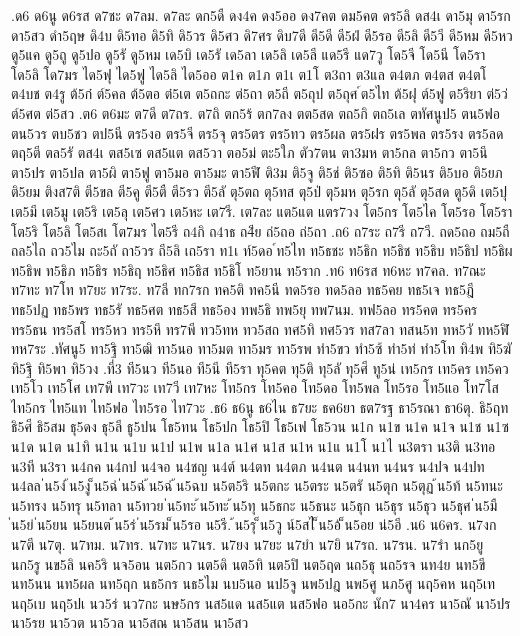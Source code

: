 {{.ด6
ด6นู
ด6รส
ด7ชะ
ด7ลม.
ด7ละ
ดก5ดื
ดง4ค
ดง5ออ
ดง7คต
ดม5คต
ดร5ลิ
ดส4เ
ดา5มุ
ดา5รก
ดา5สว
ดำ5ฤษ
ดิ4บ
ดิ5ทอ
ดิ5ทิ
ดิ5วร
ดิ5ศว
ดิ7ศร
ดิบ7ดี
ดี5ดี
ดี5ฝ่
ดี5รอ
ดี5ลิ
ดี5วี
ดี5หม
ดี5หว
ดู5แค
ดู5ถู
ดู5ปอ
ดู5รั
ดู5หม
เด5บิ
เด5รั
เด5ลา
เด5ลิ
เด5ลี
แด5รี
แด7วู
โด5จี
โด5นี
โด5รา
โด5ลิ
โด7มร
ได5ฟุ
ได5ฟู
ได5ลิ
ได5ออ
ต1ค
ต1ภ
ต1เ
ต1โ
ต3ถา
ต3แล
ต4ตภ
ต4ตส
ต4ตโ
ต4บช
ต4รู
ต้5ก๋
ต์5คล
ต้5ตอ
ต๋5เต
ต5ถกะ
ต่5ถา
ต5ถี
ต5ถุป
ต5ถุศ
์ต5ไท
ต้5ฝุ
ต์5ฟู
ต5ริยา
ต่5ว่
ต์5ศต
ต่5สว
.ต6
ต6มะ
ต7ดี
ต7ถร.
ต7ถิ
ตก5ร้
ตก7ลง
ตต5สด
ตถ5กิ
ตถ5เล
ตทัศนูป5
ตน5ฟอ
ตน5วร
ตบ5ชว
ตป5นี
ตร5งอ
ตร5จี
ตร5จุ
ตร5ตร
ตร5ทว
ตร5ผล
ตร5ฝร
ตร5พล
ตร5รง
ตร5ลด
ตฤ5ตี
ตล5รั
ตส4เ
ตส5เซ
ตส5แต
ตส5วา
ตอ5ม่
ตะ5ใภ
ตัว7ตน
ตา3มห
ตา5กล
ตา5กว
ตา5นึ
ตา5ปร
ตา5ปล
ตา5ผิ
ตา5ฟู
ตา5มอ
ตา5มะ
ตา5ฬี
ติ3ม
ติ5จู
ติ5ช่
ติ5ซอ
ติ5ทิ
ติ5นร
ติ5บอ
ติ5ยภ
ติ5ยม
ติงส7ติ
ตี5ขล
ตี5คู
ตี5ตื
ตี5รว
ตี5ลั
ตุ5ตถ
ตุ5ทส
ตุ5ป่
ตุ5มห
ตุ5รก
ตุ5ลั
ตุ5สด
ตู5ดิ
เต5ปุ
เต5มี
เต5มู
เต5ริ
เต5ลุ
เต5ศว
เต5หะ
เต7รี.
เต7ละ
แต5แต
แตร7วง
โต5กร
โต5ไค
โต5รอ
โต5รา
โต5ริ
โต5ลิ
โต5สเ
โต7มร
ไต5รี
ถ4กิ
ถ4าธ
ถ4ีย
ถ่5ถอ
ถ่5ถา
.ถ6
ถ7ระ
ถ7รี
ถ7วี.
ถด5ถอ
ถม5ถื
ถล5ไถ
ถว5ไม
ถะ5ถั
ถา5วร
ถี5ลิ
เถ5รา
ท1เ
ท์5ดอ
์ท5ไท
ท5ธชะ
ท5ธิก
ท5ธิช
ท5ธิบ
ท5ธิป
ท5ธิผ
ท5ธิพ
ท5ธิภ
ท5ธิร
ท5ธิฤ
ท5ธิศ
ท5ธิส
ท5ธิโ
ท5ยาน
ท5ราก
.ท6
ท6รส
ท6หะ
ท7คล.
ท7ณะ
ท7ทะ
ท7โท
ท7ยะ
ท7ระ.
ท7ลี
ทก7รก
ทค5ติ
ทค5นี
ทด5รอ
ทด5ลอ
ทธ5คย
ทธ5เจ
ทธ5ฎี
ทธ5ปฏ
ทธ5พร
ทธ5รั
ทธ5ศต
ทธ5สี
ทธ5อง
ทพ5ธิ
ทพ5ยุ
ทพ7นม.
ทฟ5ลอ
ทร5คต
ทร5คร
ทร5ธน
ทร5สโ
ทร5หว
ทร5หึ
ทร7พี
ทว5ทห
ทว5สถ
ทศ5ทิ
ทศ5วร
ทส7ลา
ทสน5ท
ทห5วั
ทห5ฬิ
ทห7ระ
.ทัศนู5
ทา5ฐิ
ทา5ฒิ
ทา5นอ
ทา5มต
ทา5มร
ทา5รพ
ทำ5ขว
ทำ5ซ้
ทำ5ท่
ทำ5โท
ทิ4พ
ทิ5ฆั
ทิ5ฐิ
ทิ5พา
ทิ5วง
.ที่3
ที5นว
ที5นอ
ที5นี
ที5รา
ทุ5คต
ทุ5ติ
ทุ5ลั
ทุ5ศี
ทู5น่
เท5กร
เท5คร
เท5คว
เท5โว
เท5โศ
เท7พี
เท7วะ
เท7วี
เท7หะ
โท5กร
โท5คอ
โท5ดอ
โท5พล
โท5รอ
โท5แอ
โท7โส
ไท5กร
ไท5แท
ไท5ฟอ
ไท5รอ
ไท7วะ
.ธ6
ธ6นู
ธ6ไน
ธ7ยะ
ธค6ยา
ธต7รฐ
ธา5รณา
ธา6ตุ.
ธิ5ฤท
ธิ5ศี
ธิ5สม
ธุ5ดง
ธุ5ลี
ธู5ปน
โธ5ทน
โธ5ปก
โธ5ปิ
โธ5เฟ
โธ5วน
น1ก
น1ข
น1ค
น1จ
น1ช
น1ซ
น1ด
น1ต
น1ทิ
น1น
น1บ
น1ป
น1พ
น1ล
น1ศ
น1ส
น1ห
น1แ
น1โ
น1ไ
น3ตรา
น3ติ
น3ทอ
น3ที
น3รา
น4กค
น4กป
น4จอ
น4ชญ
น4ต์
น4ตท
น4ตภ
น4นต
น4นท
น4นร
น4ปจ
น4ปท
น4ลล
่น5ง่
้น5งู
็น5ฉ่
่น5ฉ่
้น5ฉ่
้น5ฉบ
น5ต5ริ
น5ตกะ
น5ตระ
น5ตรั
น5ตุก
น5ตุฏ
้น5ท้
น5ทนะ
น5ทรง
น5ทรุ
น5ทลา
น5ทวย
่น5ทะ
้น5ทะ
้น5ทุ
น5ธกะ
น5ธนะ
น5ธุก
น5ธุร
น5ธุว
น5ธุศ
่น5มื
่น5ย่
่น5ยน
น5ยนต
้น5ร่
่น5รม
็น5รอ
น5รี.
้น5รุ
็น5วู
น์5สไ
็น5อ้
็น5อย
น่5อี
.น6
น6คร.
น7งก
น7ตี
น7ตุ.
น7ทม.
น7ทร.
น7ทะ
น7นร.
น7ยง
น7ยะ
น7ยำ
น7ยิ
น7รถ.
น7รน.
น7รำ
นก5ยู
นก5รู
นข5ลิ
นค5ริ
นจ5อน
นต5กว
นต5ดิ
นต5ทิ
นต5ปิ
นต5ฤด
นถ5ธุ
นถ5รจ
นท4ย
นท5ขี
นท5นน
นท5ผล
นท5ฤก
นธ5กร
นธ5ไม
นบ5นอ
นป5จู
นพ5ปฎ
นพ5ศู
นภ5ศู
นฤ5คห
นฤ5เท
นฤ5เบ
นฤ5ปเ
นว5ร่
นว7กะ
นษ5กร
นส5แด
นส5แต
นส5ฟอ
นอ5กะ
นัก7
นา4คร
นา5ณั
นา5ปร
นา5รย
นา5วต
นา5วล
นา5สณ
นา5สน
นา5สว
}}
